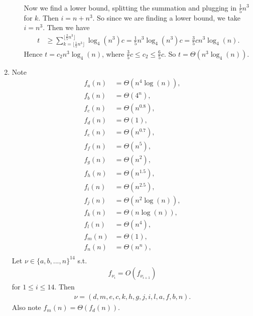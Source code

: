 \documentclass[10pt,oneside,reqno]{amsart}
\theoremstyle{plain}
\theoremstyle{definition}
\begin{document}
\begin{enumerate}[label=\arabic*.]
\begin{enumerate}
\begin{equation}
\begin{aligned}
\end{aligned}
\end{equation}
Now we find a lower bound, splitting the summation and plugging in $\frac{1}{5}n^3$ for $k$. Then $i = n + n^3$. So since we are finding a lower bound, we take $i = n^3$. Then we have
\begin{equation}
\begin{aligned}
t &\geq \sum_{k = \lfloor \frac{1}{5}n^3\rfloor}^{\lfloor \frac{2}{5}n^3\rfloor}\log_4(n^3)c = \frac{1}{5}n^3\log_4(n^3)c = \boxed{\frac{3}{5}cn^3\log_4(n). }
\end{aligned}
\end{equation}
Hence $t = c_2n^3\log_4(n)$, where $\frac{3}{5}c \leq c_2 \leq \frac{6}{5}c$. So $t = \boxed{\Theta (n^3\log_4(n)).}$\\









\end{enumerate}

\item Note
\begin{equation}
\begin{aligned}
f_a(n) &= \Theta(n^4\log(n)),\\
f_b(n) &= \Theta (4^n),\\
f_c(n) &= \Theta (n^{0.8}),\\
f_d(n) &= \Theta (1),\\
f_e(n) &= \Theta(n^{0.7}),\\
f_f(n) &= \Theta(n^5),\\
f_g(n) &=\Theta( n^2),\\
f_h(n) &= \Theta(n^{1.5}),\\
f_i(n) &= \Theta(n^{2.5}),\\
f_j(n) &= \Theta(n^2 \log(n)),\\
f_k(n) &= \Theta(n \log(n)),\\
f_l(n) &= \Theta(n^4),\\
f_m(n) &= \Theta(1),\\
f_n(n) &= \Theta(n^n),\\
\end{aligned}
\end{equation}
Let $\nu \in \{a,b,...,n\}^{14}$ s.t. 
\begin{equation}
\begin{aligned}
f_{\nu_i} = O(f_{\nu_{i + 1}})
\end{aligned}
\end{equation}
for $1 \leq i \leq 14$. Then 
\begin{equation}
\begin{aligned}
\nu = (d,m,e,c,k,h,g,j,i,l,a,f,b,n).
\end{aligned}
\end{equation}
Also note $f_m(n) = \Theta(f_d(n))$. 






\end{enumerate}
\end{document}
